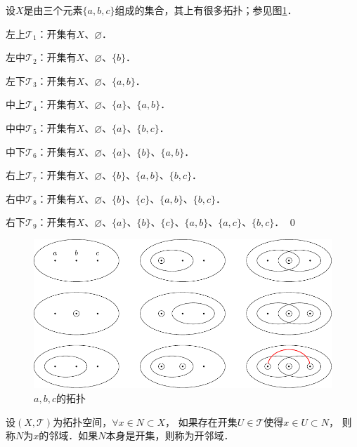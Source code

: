 \begin{example}
    设$X$是由三个元素$\{a,b,c\}$组成的集合，其上有很多拓扑；参见图\ref{chtop:pic_top}．
\end{example}

    
左上$\mathscr{T}_1$：开集有$X$、$\varnothing$．

左中$\mathscr{T}_2$：开集有$X$、$\varnothing$、$\{b\}$．

左下$\mathscr{T}_3$：开集有$X$、$\varnothing$、$\{a, b\}$．

中上$\mathscr{T}_4$：开集有$X$、$\varnothing$、$\{a\}$、$\{a,b\}$．

中中$\mathscr{T}_5$：开集有$X$、$\varnothing$、$\{a\}$、$\{b,c\}$．

中下$\mathscr{T}_6$：开集有$X$、$\varnothing$、$\{a\}$、$\{b\}$、$\{a, b\}$．

右上$\mathscr{T}_7$：开集有$X$、$\varnothing$、$\{b\}$、$\{a,b\}$、$\{b,c\}$．

右中$\mathscr{T}_8$：开集有$X$、$\varnothing$、$\{b\}$、$\{c\}$、$\{a,b\}$、$\{b,c\}$．

右下$\mathscr{T}_9$：开集有$X$、$\varnothing$、$\{a\}$、$\{b\}$、$\{c\}$、$\{a, b\}$、$\{a, c\}$、$\{ b,c\}$．
\qed


\begin{figure}[htb]
    \centering
    \includegraphics{fig/ch2-top.pdf}
    \caption{$a,b,c$的拓扑}\label{chtop:pic_top}
\end{figure}



\begin{definition}\label{chtop:eqn_neighbor}
    设$(X,\mathscr{T})$为拓扑空间，$\forall x\in N \subset X$，
    如果存在开集$U\in \mathscr{T}$使得$x\in U \subset N $，
    则称$N$为$x$的{\heiti 邻域}．如果$N$本身是开集，则称为{\heiti 开邻域}．
\end{definition}

